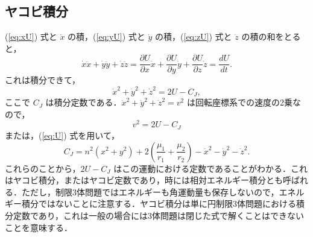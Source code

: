 \documentclass[11pt,a4paper,oneside,onecolumn]{jreport}
\begin{document}
\subsection{ヤコビ積分}
(\ref{eq:xU}) 式と $\dot{x}$ の積，(\ref{eq:yU}) 式と $\dot{y}$ の積，(\ref{eq:zU}) 式と $\dot{z}$ の積の和をとると，
\begin{equation}
\dot{x} \ddot{x} + \dot{y} \ddot{y} + \dot{z} \ddot{z} = \frac{\partial U}{\partial x} \dot{x} + \frac{\partial U}{\partial y} \dot{y} + \frac{\partial U}{\partial z} \dot{z} = \frac{dU}{dt}.
\end{equation}
これは積分できて，
\begin{equation}
\dot{x}^2 + \dot{y}^2 + \dot{z}^2 = 2 U - C_J, \label{eq:2U-C_J}
\end{equation}
ここで $C_J$ は積分定数である．$\dot{x}^2 + \dot{y}^2 + \dot{z}^2 = v^2$ は回転座標系での速度の2乗なので，
\begin{equation}
v^2 = 2 U - C_J
\end{equation}
または，(\ref{eq:U}) 式を用いて，
\begin{equation}
C_J = n^2 (x^2 + y^2) + 2 \left( \frac{\mu_1}{r_1} + \frac{\mu_2}{r_2} \right) - \dot{x}^2 - \dot{y}^2 - \dot{z}^2.
\end{equation}
これらのことから，$2 U - C_J$ はこの運動における定数であることがわかる．これはヤコビ積分，またはヤコビ定数であり，時には相対エネルギー積分とも呼ばれる．ただし，制限3体問題ではエネルギーも角運動量も保存しないので，エネルギー積分ではないことに注意する．ヤコビ積分は単に円制限3体問題における積分定数であり，これは一般の場合には3体問題は閉じた式で解くことはできないことを意味する．
\end{document}
